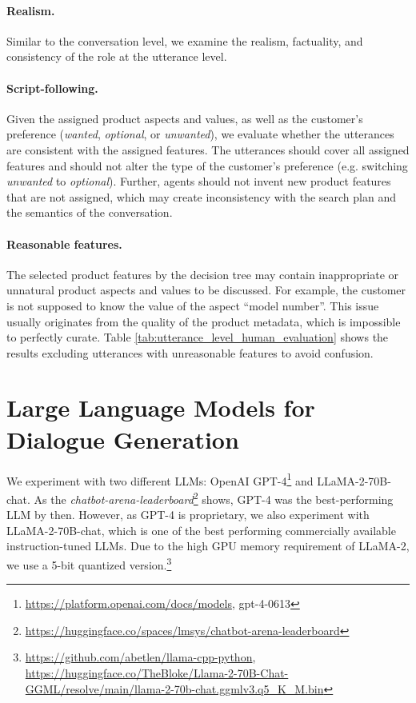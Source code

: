 \paragraph{Realism.} Similar to the conversation level, we examine the realism, factuality, and consistency of the role at the utterance level.

\paragraph{Script-following.} Given the assigned product aspects and values, as well as the customer's preference (\textit{wanted}, \textit{optional}, or \textit{unwanted}), we evaluate whether the utterances are consistent with the assigned features. The utterances should cover all assigned features and should not alter the type of the customer's preference (e.g. switching \textit{unwanted} to \textit{optional}). Further, agents should not invent new product features that are not assigned, which may create inconsistency with the search plan and the semantics of the conversation.

\paragraph{Reasonable features.} The selected product features by the decision tree may contain inappropriate or unnatural product aspects and values to be discussed. For example, the customer is not supposed to know the value of the aspect ``model number''. This issue usually originates from the quality of the product metadata, which is impossible to perfectly curate. Table \ref{tab:utterance_level_human_evaluation} shows the results excluding utterances with unreasonable features to avoid confusion.



\section{Large Language Models for Dialogue Generation} \label{sec:llm}
We experiment with two different LLMs: OpenAI GPT-4\footnote{\url{https://platform.openai.com/docs/models}, gpt-4-0613} and LLaMA-2-70B-chat. As the \textit{chatbot-arena-leaderboard}\footnote{\url{https://huggingface.co/spaces/lmsys/chatbot-arena-leaderboard}} shows, GPT-4 was the best-performing LLM by then.
However, as GPT-4 is proprietary, we also experiment with LLaMA-2-70B-chat, which is one of the best performing commercially available instruction-tuned LLMs. Due to the high GPU memory requirement of LLaMA-2, we use a 5-bit quantized version.\footnote{\url{https://github.com/abetlen/llama-cpp-python}, \url{https://huggingface.co/TheBloke/Llama-2-70B-Chat-GGML/resolve/main/llama-2-70b-chat.ggmlv3.q5_K_M.bin}}


